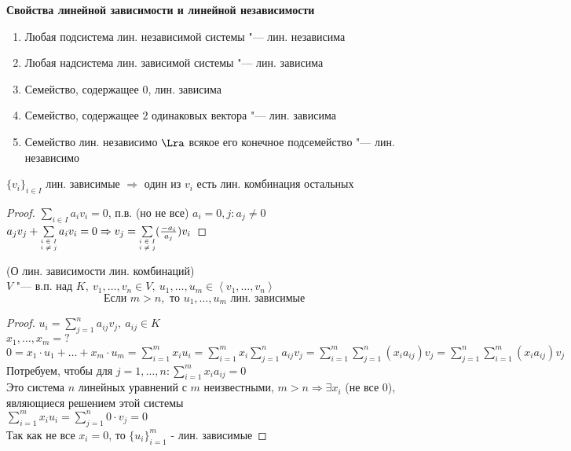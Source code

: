 \textbf{Свойства линейной зависимости и линейной независимости}

\begin{enumerate}
	\item
		Любая подсистема лин. независимой системы "--- лин. независима
	\item
		Любая надсистема лин. зависимой системы "--- лин. зависима
	\item
		Семейство, содержащее $0$, лин. зависима
	\item
		Семейство, содержащее $2$ одинаковых вектора "--- лин. зависима
	\item
		Семейство лин. независимо $\Lra$ всякое его конечное подсемейство "--- лин. независимо
\end{enumerate}

\begin{lemma}
	$\{ v_i \}_{i \in I}$ лин. зависимые $\Rightarrow$ один из $v_i$ есть лин. комбинация остальных
\end{lemma}
\begin{proof}
	$\sum\limits_{i \in I} a_iv_i = 0$, п.в. (но не все) $a_i = 0, j \colon a_j \neq 0$ \\
	$a_jv_j + \sum\limits_{\substack{\text{\tiny{$i \in I $}} \\ \text{\tiny{$i \neq j $}}}} a_iv_i = 0 \Rightarrow v_j = \sum\limits_{\substack{\text{\tiny{$i \in I $}} \\ \text{\tiny{$i \neq j $}}}} (\frac{-a_i}{a_j})v_i$
\end{proof}

\begin{theorem}
	(О лин. зависимости лин. комбинаций) \\
	$V$ "--- в.п. над $K, ~ v_1, \dots, v_n \in V, ~ u_1, \dots, u_m \in \left< v_1, \dots, v_n \right>$ \\
	\[\text{Если } m > n, \text{ то } u_1, \dots, u_m \text{ лин. зависимые}\]
\end{theorem}
\begin{proof}
	$u_i = \sum\limits_{j = 1}^{n} a_{ij}v_j, ~ a_{ij} \in K$ \\
	$x_1, \dots, x_m = ?$ \\
	$0 = x_1 \cdot u_1 + \dots + x_m \cdot u_m = \sum\limits_{i = 1}^{m} x_iu_i = \sum\limits_{i = 1}^{m} x_i \sum\limits_{j = 1}^{n} a_{ij}v_j = \sum\limits_{i = 1}^{m} \sum\limits_{j = 1}^{n} (x_ia_{ij})v_j = \sum\limits_{j = 1}^{n} \sum\limits_{i = 1}^{m} (x_ia_{ij})v_j$ \\
	Потребуем, чтобы для $j = 1, \dots, n \colon \sum\limits_{i = 1}^{m} x_ia_{ij} = 0$ \\
	Это система $n$ линейных уравнений с $m$ неизвестными, $m > n \Rightarrow \exists x_i$ (не все $0$), являющиеся решением этой системы \\
	$\sum\limits_{i = 1}^{m} x_iu_i = \sum\limits_{j = 1}^{n} 0 \cdot v_j = 0$ \\
	Так как не все $x_i = 0$, то $\{u_i\}_{i = 1}^{m}$ - лин. зависимые
\end{proof}
